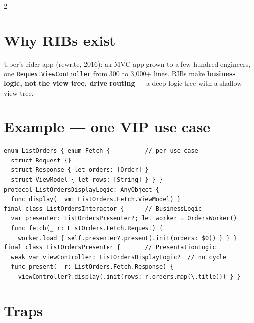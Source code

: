 \documentclass[8pt]{extarticle}
\begin{document}
\begin{multicols}{2}
\section{Why RIBs exist}
Uber's rider app (rewrite, 2016): an MVC app grown to a few hundred engineers, one
\texttt{RequestViewController} from 300 to 3,000+ lines. RIBs make \textbf{business logic, not
the view tree, drive routing} — a deep logic tree with a shallow view tree.

\section{Example — one VIP use case}
\begin{lstlisting}[language=SwiftSheet]
enum ListOrders { enum Fetch {          // per use case
  struct Request {}
  struct Response { let orders: [Order] }
  struct ViewModel { let rows: [String] } } }
protocol ListOrdersDisplayLogic: AnyObject {
  func display(_ vm: ListOrders.Fetch.ViewModel) }
final class ListOrdersInteractor {      // BusinessLogic
  var presenter: ListOrdersPresenter?; let worker = OrdersWorker()
  func fetch(_ r: ListOrders.Fetch.Request) {
    worker.load { self.presenter?.present(.init(orders: $0)) } } }
final class ListOrdersPresenter {       // PresentationLogic
  weak var viewController: ListOrdersDisplayLogic?  // no cycle
  func present(_ r: ListOrders.Fetch.Response) {
    viewController?.display(.init(rows: r.orders.map(\.title))) } }
\end{lstlisting}

\section{Traps}
\begin{itemize}
\end{itemize}

\end{multicols}

\end{document}
